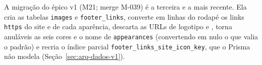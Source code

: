 

A migração do épico v1 (M21; merge M-039) é a terceira e a mais recente. Ela cria as tabelas \texttt{images} e \texttt{footer\_links}, converte em linhas do rodapé os links \texttt{https} do site e de cada aparência, descarta as URLs de logotipo e , torna anuláveis as seis cores e o nome de \texttt{appearances} (convertendo em nulo o que valia o padrão) e recria o índice parcial \texttt{footer\_links\_site\_icon\_key}, que o Prisma não modela (Seção~\ref{sec:arq-dados-v1}).


